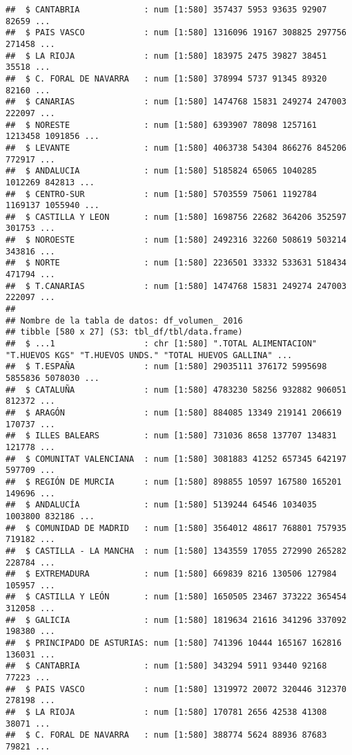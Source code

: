 \documentclass[
]{article}
\begin{document}
\begin{verbatim}
##  $ CANTABRIA             : num [1:580] 357437 5953 93635 92907 82659 ...
##  $ PAIS VASCO            : num [1:580] 1316096 19167 308825 297756 271458 ...
##  $ LA RIOJA              : num [1:580] 183975 2475 39827 38451 35518 ...
##  $ C. FORAL DE NAVARRA   : num [1:580] 378994 5737 91345 89320 82160 ...
##  $ CANARIAS              : num [1:580] 1474768 15831 249274 247003 222097 ...
##  $ NORESTE               : num [1:580] 6393907 78098 1257161 1213458 1091856 ...
##  $ LEVANTE               : num [1:580] 4063738 54304 866276 845206 772917 ...
##  $ ANDALUCIA             : num [1:580] 5185824 65065 1040285 1012269 842813 ...
##  $ CENTRO-SUR            : num [1:580] 5703559 75061 1192784 1169137 1055940 ...
##  $ CASTILLA Y LEON       : num [1:580] 1698756 22682 364206 352597 301753 ...
##  $ NOROESTE              : num [1:580] 2492316 32260 508619 503214 343816 ...
##  $ NORTE                 : num [1:580] 2236501 33332 533631 518434 471794 ...
##  $ T.CANARIAS            : num [1:580] 1474768 15831 249274 247003 222097 ...
##  
## Nombre de la tabla de datos: df_volumen_ 2016 
## tibble [580 x 27] (S3: tbl_df/tbl/data.frame)
##  $ ...1                  : chr [1:580] ".TOTAL ALIMENTACION" "T.HUEVOS KGS" "T.HUEVOS UNDS." "TOTAL HUEVOS GALLINA" ...
##  $ T.ESPAÑA              : num [1:580] 29035111 376172 5995698 5855836 5078030 ...
##  $ CATALUÑA              : num [1:580] 4783230 58256 932882 906051 812372 ...
##  $ ARAGÓN                : num [1:580] 884085 13349 219141 206619 170737 ...
##  $ ILLES BALEARS         : num [1:580] 731036 8658 137707 134831 121778 ...
##  $ COMUNITAT VALENCIANA  : num [1:580] 3081883 41252 657345 642197 597709 ...
##  $ REGIÓN DE MURCIA      : num [1:580] 898855 10597 167580 165201 149696 ...
##  $ ANDALUCÍA             : num [1:580] 5139244 64546 1034035 1003800 832186 ...
##  $ COMUNIDAD DE MADRID   : num [1:580] 3564012 48617 768801 757935 719182 ...
##  $ CASTILLA - LA MANCHA  : num [1:580] 1343559 17055 272990 265282 228784 ...
##  $ EXTREMADURA           : num [1:580] 669839 8216 130506 127984 105957 ...
##  $ CASTILLA Y LEÓN       : num [1:580] 1650505 23467 373222 365454 312058 ...
##  $ GALICIA               : num [1:580] 1819634 21616 341296 337092 198380 ...
##  $ PRINCIPADO DE ASTURIAS: num [1:580] 741396 10444 165167 162816 136031 ...
##  $ CANTABRIA             : num [1:580] 343294 5911 93440 92168 77223 ...
##  $ PAIS VASCO            : num [1:580] 1319972 20072 320446 312370 278198 ...
##  $ LA RIOJA              : num [1:580] 170781 2656 42538 41308 38071 ...
##  $ C. FORAL DE NAVARRA   : num [1:580] 388774 5624 88936 87683 79821 ...

\end{verbatim}
\end{document}
